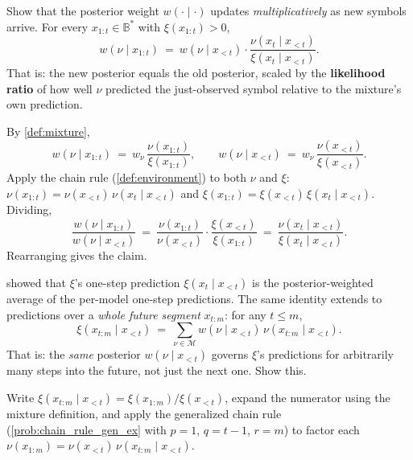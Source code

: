 \documentclass[fontsize=11pt, parskip=half]{scrartcl}
\newcommand{\Mc}{\mathcal{M}}
\begin{document}
\begin{exercise}
\label{prob:posterior_update_ex}



Show that the posterior weight $w(\cdot \mid \cdot)$ updates \emph{multiplicatively} as new symbols arrive. For every $x_{1:t} \in \mathbb{B}^*$ with $\xi(x_{1:t}) > 0$,
\[
  w(\nu \mid x_{1:t}) ~=~ w(\nu \mid x_{<t}) \cdot \frac{\nu(x_t \mid x_{<t})}{\xi(x_t \mid x_{<t})}.
\]
That is: the new posterior equals the old posterior, scaled by the \textbf{likelihood ratio} of how well $\nu$ predicted the just-observed symbol relative to the mixture's own prediction.
\end{exercise}

\begin{solution}
By \cref{def:mixture},
\[
  w(\nu \mid x_{1:t}) ~=~ w_\nu \,\frac{\nu(x_{1:t})}{\xi(x_{1:t})},
  \qquad
  w(\nu \mid x_{<t}) ~=~ w_\nu \,\frac{\nu(x_{<t})}{\xi(x_{<t})}.
\]
Apply the chain rule (\cref{def:environment}) to both $\nu$ and $\xi$: $\nu(x_{1:t}) = \nu(x_{<t})\,\nu(x_t \mid x_{<t})$ and $\xi(x_{1:t}) = \xi(x_{<t})\,\xi(x_t \mid x_{<t})$. Dividing,
\[
  \frac{w(\nu \mid x_{1:t})}{w(\nu \mid x_{<t})}
  ~=~ \frac{\nu(x_{1:t})}{\nu(x_{<t})} \cdot \frac{\xi(x_{<t})}{\xi(x_{1:t})}
  ~=~ \frac{\nu(x_t \mid x_{<t})}{\xi(x_t \mid x_{<t})}.
\]
Rearranging gives the claim. \qedhere
\end{solution}

\begin{exercise}
\label{prob:multi_step_xi_ex}



 showed that $\xi$'s one-step prediction $\xi(x_t \mid x_{<t})$ is the posterior-weighted average of the per-model one-step predictions. The same identity extends to predictions over a \emph{whole future segment} $x_{t:m}$: for any $t \leq m$,
\[
  \xi(x_{t:m} \mid x_{<t}) ~=~ \sum_{\nu \in \Mc} w(\nu \mid x_{<t})\, \nu(x_{t:m} \mid x_{<t}).
\]
That is: the \emph{same} posterior $w(\nu \mid x_{<t})$ governs $\xi$'s predictions for arbitrarily many steps into the future, not just the next one. Show this.

\begin{hint}
Write $\xi(x_{t:m} \mid x_{<t}) = \xi(x_{1:m}) / \xi(x_{<t})$, expand the numerator using the mixture definition, and apply the generalized chain rule (\cref{prob:chain_rule_gen_ex} with $p=1$, $q=t-1$, $r=m$) to factor each $\nu(x_{1:m}) = \nu(x_{<t})\,\nu(x_{t:m} \mid x_{<t})$.
\end{hint}
\end{exercise}
\end{document}
